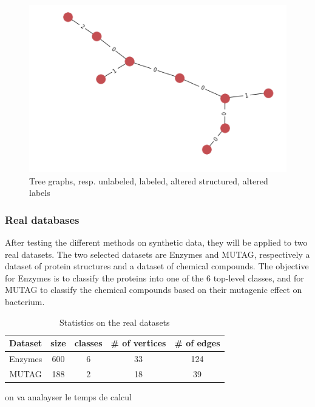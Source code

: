 \documentclass{article}
\theoremstyle{definition}
\begin{document}
\begin{figure}[!htb]
\begin{multicols}{4}
		\includegraphics[width=\linewidth]{data/generated-graphs/tree_altered_labels.png}\par
	\end{multicols}
	\caption{Tree graphs, resp. unlabeled, labeled, altered structured, altered labels}
\end{figure}
\subsubsection{Real databases}
After testing the different methods on synthetic data, they will be applied to two real datasets. The two selected datasets are Enzymes and MUTAG, respectively a dataset of protein structures and a dataset of chemical compounds. The objective for Enzymes is to classify the proteins into one of the 6 top-level classes, and for MUTAG to classify the chemical compounds based on their mutagenic effect on bacterium.
\begin{table}[!htb]
	\begin{center}
		\begin{tabular}{|c|c|c|c|c|}
			\hline
			Dataset & size & classes & \# of vertices & \# of edges\\
			\hline
			Enzymes & 600 & 6 & 33 & 124\\
			MUTAG & 188 & 2 & 18 & 39\\
			\hline
		\end{tabular}
	\end{center}
	\caption {Statistics on the real datasets}
	\label{tab:stats_real}
\end{table}on va analayser le temps de calcul
\end{document}
